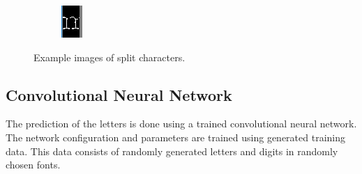 \documentclass[english, paper=a4]{scrartcl}
\begin{document}
\begin{figure}
\begin{subfigure}{0.05\textwidth}
		\label{fig:ex2b}
	\end{subfigure}
	\begin{subfigure}{0.1\textwidth}
		\includegraphics[width=\textwidth]{splitChars3.PNG}
		\label{fig:ex2b}
	\end{subfigure}
	\caption{Example images of split characters.}
	\label{fig:ex_split_characters}
\end{figure}

\subsection{Convolutional Neural Network}

The prediction of the letters is done using a trained convolutional neural network. The network configuration and parameters are trained using generated training data. This data consists of randomly generated letters and digits in randomly chosen fonts.
\end{document}

